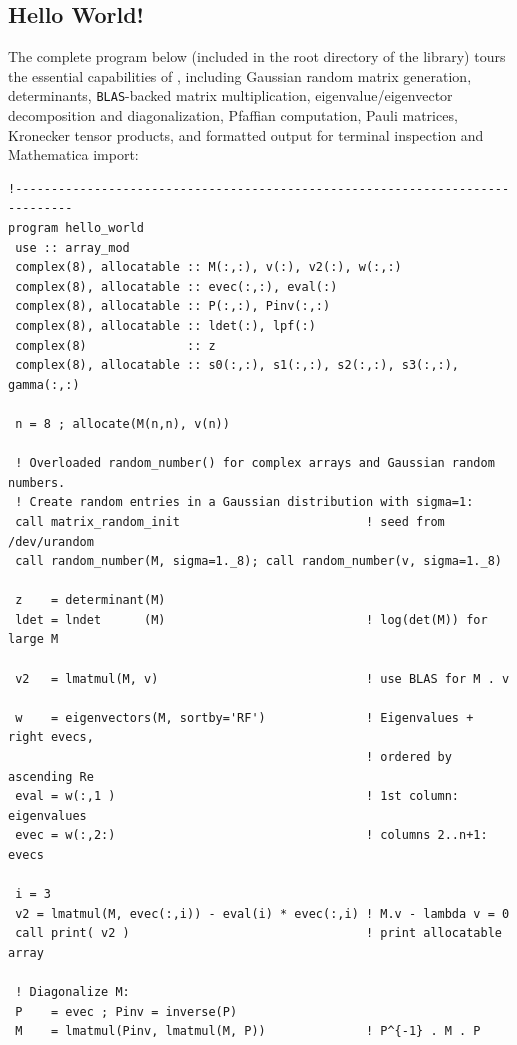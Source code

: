 \subsection{Hello World!}
\label{subsec:hello_world}

The complete  program below (included in the root directory of the library) tours the essential capabilities of , including Gaussian random matrix generation, determinants, \texttt{BLAS}-backed matrix multiplication, eigenvalue/eigenvector decomposition and diagonalization, Pfaffian computation, Pauli matrices, Kronecker tensor products, and formatted output for terminal inspection and Mathematica import:

\lstset{language=[95]Fortran}
\begin{lstlisting}
!------------------------------------------------------------------------------
program hello_world
 use :: array_mod
 complex(8), allocatable :: M(:,:), v(:), v2(:), w(:,:)
 complex(8), allocatable :: evec(:,:), eval(:)
 complex(8), allocatable :: P(:,:), Pinv(:,:)
 complex(8), allocatable :: ldet(:), lpf(:)
 complex(8)              :: z
 complex(8), allocatable :: s0(:,:), s1(:,:), s2(:,:), s3(:,:), gamma(:,:)

 n = 8 ; allocate(M(n,n), v(n))

 ! Overloaded random_number() for complex arrays and Gaussian random numbers.
 ! Create random entries in a Gaussian distribution with sigma=1:
 call matrix_random_init                          ! seed from /dev/urandom
 call random_number(M, sigma=1._8); call random_number(v, sigma=1._8)

 z    = determinant(M)
 ldet = lndet      (M)                            ! log(det(M)) for large M

 v2   = lmatmul(M, v)                             ! use BLAS for M . v

 w    = eigenvectors(M, sortby='RF')              ! Eigenvalues + right evecs,
                                                  ! ordered by ascending Re
 eval = w(:,1 )                                   ! 1st column: eigenvalues
 evec = w(:,2:)                                   ! columns 2..n+1: evecs

 i = 3
 v2 = lmatmul(M, evec(:,i)) - eval(i) * evec(:,i) ! M.v - lambda v = 0
 call print( v2 )                                 ! print allocatable array

 ! Diagonalize M:
 P    = evec ; Pinv = inverse(P)
 M    = lmatmul(Pinv, lmatmul(M, P))              ! P^{-1} . M . P


\end{lstlisting}
